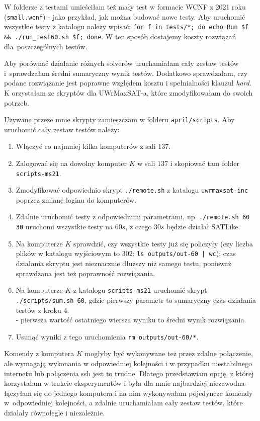 \documentclass[shortabstract]{iithesis}
\begin{document}
W folderze z testami umieściłam też mały test w formacie WCNF z 2021 roku (\texttt{small.wcnf}) - jako przykład, jak można budować nowe testy.
Aby uruchomić wszystkie testy z katalogu należy wpisać:
\texttt{for f in tests/*; do echo Run \$f \&\& ./run\_test60.sh \$f; done}.
W ten sposób dostajemy koszty rozwiązań dla~poszczególnych testów.

Aby porównać działanie różnych solverów uruchamiałam cały zestaw testów i~sprawdzałam średni sumaryczny wynik testów. Dodatkowo sprawdzałam, czy podane rozwiązanie jest poprawne względem kosztu i spełnialności klauzul \textit{hard}. K orzystałam ze skryptów dla UWrMaxSAT-a, które zmodyfikowałam do swoich potrzeb.

Używane przeze mnie skrypty zamieszczam w folderu \texttt{april/scripts}. Aby uruchomić cały zestaw testów należy:

\begin{enumerate}
	\item Włączyć co najmniej kilka komputerów z sali $137$.
	\item Zalogować się na dowolny komputer $K$ w sali $137$ i skopiować tam folder \texttt{scripts-ms21}.
	\item Zmodyfikować odpowiednio skrypt \texttt{./remote.sh} z katalogu \texttt{uwrmaxsat-inc} poprzez zmianę loginu do komputerów.
	\item Zdalnie uruchomić testy z odpowiednimi parametrami, np. \texttt{./remote.sh 60 30} uruchomi wszystkie testy na $60s$, z czego $30s$ będzie działał SATLike. 
	\item Na komputerze $K$ sprawdzić, czy wszystkie testy już się policzyły (czy liczba plików w katalogu wyjściowym to 302: \texttt{ls outputs/out-60 | wc}); czas działania skryptu jest nieznacznie dłuższy niż samego testu, ponieważ sprawdzana jest też poprawność rozwiązania.
	\item Na komputerze $K$ z katalogu \texttt{scripts-ms21} uruchomić skrypt \texttt{./scripts/sum.sh 60}, gdzie pierwszy parametr to sumaryczny czas działania testów z kroku 4. \\ - pierwsza wartość ostatniego wiersza wyniku to średni wynik rozwiązania.
	\item Usunąć wyniki z tego uruchomienia \texttt {rm outputs/out-60/*}.
\end{enumerate}

Komendy z komputera $K$ mogłyby być wykonywane też przez zdalne połączenie, ale wymagają wykonania w odpowiedniej kolejności i w przypadku niestabilnego internetu lub połączenia ssh jest to trudne. Dlatego przedstawiam opcję, z której korzystałam w trakcie eksperymentów i była dla mnie najbardziej niezawodna - łączyłam się do jednego komputera i na nim wykonywałam pojedyncze komendy w~odpowiedniej kolejności, a zdalnie uruchamiałam cały zestaw testów, które działały równolegle i niezależnie.
\end{document}

